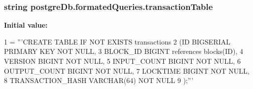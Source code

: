 \subsubsection[{transaction\+Table}]{\setlength{\rightskip}{0pt plus 5cm}string postgre\+Db.\+formated\+Queries.\+transaction\+Table}\label{namespacepostgreDb_1_1formatedQueries_a347aa8c6b951a1569e8bd73dd7756890}
{\bfseries Initial value\+:}
\begin{DoxyCode}
1 = \textcolor{stringliteral}{'''CREATE TABLE IF NOT EXISTS transactions}
2 \textcolor{stringliteral}{                (ID                 BIGSERIAL PRIMARY KEY   NOT NULL,}
3 \textcolor{stringliteral}{                BLOCK\_ID            BIGINT              references blocks(ID),}
4 \textcolor{stringliteral}{                VERSION             BIGINT              NOT NULL,}
5 \textcolor{stringliteral}{                INPUT\_COUNT         BIGINT              NOT NULL,}
6 \textcolor{stringliteral}{                OUTPUT\_COUNT        BIGINT              NOT NULL,}
7 \textcolor{stringliteral}{                LOCKTIME            BIGINT              NOT NULL,}
8 \textcolor{stringliteral}{                TRANSACTION\_HASH    VARCHAR(64)         NOT NULL}
9 \textcolor{stringliteral}{                );'''}
\end{DoxyCode}
